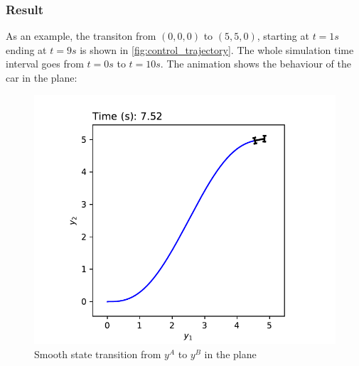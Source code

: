 \documentclass[a4paper,11pt,headings=standardclasses,parskip=half]{scrartcl}
\begin{document}
\subsubsection{Result}
\label{subsec:result}
As an example, the transiton from $(0, 0, 0)$ to $(5, 5, 0)$, starting at $t=1s$ ending at $t=9s$ is shown in \autoref{fig:control_trajectory}. The whole simulation time interval goes from $t=0s$ to $t=10s$.
The animation shows the behaviour of the car in the plane:
\begin{figure}[ht]
\centering
\includegraphics[scale=1]{img/plane_trajectory.pdf}
\caption{Smooth state transition from $y^A$ to $y^B$ in the plane}
\label{fig:plane_trajectory}
\end{figure}
\end{document}

